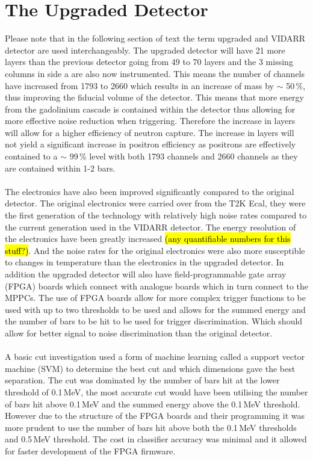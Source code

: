 \documentclass[12pt,a4paper]{article}
\begin{document}
\section{The Upgraded Detector}\label{sec_theUpgradedDetector}
Please note that in the following section of text the term upgraded and VIDARR detector are used interchangeably. The upgraded detector will have 21 more layers than the previous detector going from 49 to 70 layers and the 3 missing columns in side a are also now instrumented. This means the number of channels have increased from 1793 to 2660 which results in an increase of mass by $\sim$ 50\,\%, thus improving the fiducial volume of the detector. This means that more energy from the gadolinium cascade is contained within the detector thus allowing for more effective noise reduction when triggering. Therefore the increase in layers will allow for a higher efficiency of neutron capture. The increase in layers will not yield a significant increase in positron efficiency as positrons are effectively contained to a $\sim$ 99\,\% level with both 1793 channels and 2660 channels as they are contained within 1-2 bars.
\\\\The electronics have also been improved significantly compared to the original detector. The original electronics were carried over from the T2K Ecal, they were the first generation of the technology with relatively high noise rates compared to the current generation used in the VIDARR detector. The energy resolution of the electronics have been greatly increased \hl{(any quantifiable numbers for this stuff?)}. And the noise rates for the original electronics were also more susceptible to changes in temperature than the electronics in the upgraded detector. In addition the upgraded detector will also have field-programmable gate array (FPGA) boards which connect with analogue boards which in turn connect to the MPPCs. The use of FPGA boards allow for more complex trigger functions to be used with up to two thresholds to be used and allows for the summed energy and the number of bars to be hit to be used for trigger discrimination. Which should allow for better signal to noise discrimination than the original detector.
\\\\A basic cut investigation used a form of machine learning called a support vector machine (SVM) to determine the best cut and which dimensions gave the best separation. The cut was dominated by the number of bars hit at the lower threshold of 0.1\,MeV, the most accurate cut would have been utilising the number of bars hit above 0.1\,MeV and the summed energy above the 0.1\,MeV threshold. However due to the structure of the FPGA boards and their programming it was more prudent to use the number of bars hit above both the 0.1\,MeV thresholds and 0.5\,MeV threshold. The cost in classifier accuracy was minimal and it allowed for faster development of the FPGA firmware. 
\end{document}

